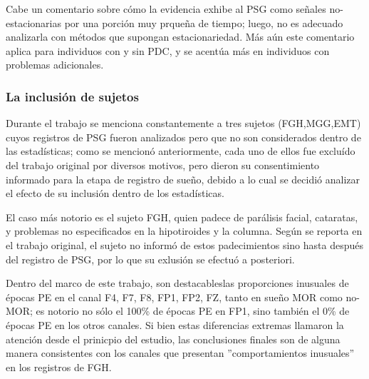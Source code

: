 Cabe un comentario sobre c\'omo la evidencia exhibe al PSG como se\~nales no-estacionarias
por una porci\'on muy prque\~na de tiempo; luego, no es adecuado analizarla con m\'etodos que
supongan estacionariedad. M\'as a\'un este comentario aplica para individuos con y sin PDC, y
se acent\'ua m\'as en individuos con problemas adicionales.

\subsubsection{La inclusi\'on de sujetos}


Durante el trabajo se menciona constantemente a tres sujetos (FGH,MGG,EMT) cuyos
registros de PSG fueron analizados
pero que no son considerados dentro de las estad\'isticas; 
como se mencion\'o anteriormente,
cada uno de ellos fue exclu\'ido del
trabajo original \cite{VazquezTagle16} 
por diversos motivos, pero dieron su consentimiento informado para la etapa
de registro de sue\~no, 
debido a lo cual se decidi\'o analizar el efecto de su inclusi\'on dentro 
de los estad\'isticas.

El caso m\'as notorio es el sujeto FGH, quien padece de par\'alisis facial,
cataratas, y problemas 
no especificados en la 
hipotiroides y la columna. Seg\'un se reporta en el trabajo original,
el sujeto no inform\'o de estos padecimientos sino hasta despu\'es del registro de PSG, por lo
que su exlusi\'on se efectu\'o a posteriori.

Dentro del marco de este trabajo, son destacableslas proporciones inusuales de \'epocas PE
en el canal F4, F7, F8, FP1, FP2, FZ, tanto en sue\~no MOR como no-MOR; es notorio no s\'olo
el 100\% de \'epocas PE en FP1, sino tambi\'en el 0\% de \'epocas PE en los otros canales. 
Si bien estas diferencias extremas llamaron la atenci\'on desde el prinicpio del estudio,
las conclusiones finales son de alguna manera consistentes con los canales que presentan 
''comportamientos inusuales'' en los registros de FGH.

